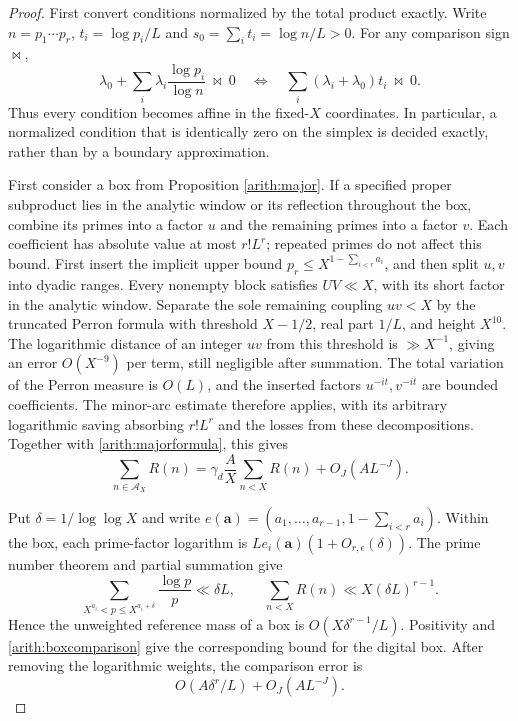 \documentclass[11pt,a4paper]{article}
\theoremstyle{paperplain}
\numberwithin{equation}{section}
\begin{document}
\begin{proof}
First convert conditions normalized by the total product exactly.
Write $n=p_1\cdots p_r$, $t_i=\log p_i/L$ and
$s_0=\sum_i t_i=\log n/L>0$. For any comparison sign $\bowtie$,
\begin{equation}\label{arith:homogenize}
 \lambda_0+\sum_i\lambda_i\frac{\log p_i}{\log n}\ \bowtie\ 0
 \quad\Longleftrightarrow\quad
 \sum_i(\lambda_i+\lambda_0)t_i\ \bowtie\ 0.
\end{equation}
Thus every condition becomes affine in the fixed-$X$ coordinates.
In particular, a normalized condition that is identically zero on
the simplex is decided exactly, rather than by a boundary approximation.

First consider a box from Proposition \ref{arith:major}.
If a specified proper subproduct lies in the analytic window or its
reflection throughout the box, combine its primes into a factor $u$
and the remaining primes into a factor $v$.
Each coefficient has absolute value at most $r!L^r$; repeated primes
do not affect this bound.
First insert the implicit upper bound $p_r\le X^{1-\sum_{i<r}a_i}$,
and then split $u,v$ into dyadic ranges.
Every nonempty block satisfies $UV\ll X$, with its short factor in
the analytic window.
Separate the sole remaining coupling $uv<X$ by the truncated Perron
formula with threshold $X-1/2$, real part $1/L$, and height $X^{10}$.
The logarithmic distance of an integer $uv$ from this threshold is
$\gg X^{-1}$, giving an error $O(X^{-9})$ per term, still negligible
after summation.
The total variation of the Perron measure is $O(L)$, and the inserted
factors $u^{-it},v^{-it}$ are bounded coefficients.
The minor-arc estimate therefore applies, with its arbitrary logarithmic
saving absorbing $r!L^r$ and the losses from these decompositions.
Together with \eqref{arith:majorformula}, this gives
\begin{equation}\label{arith:boxcomparison}
 \sum_{n\in\mathcal A_X}R(n)
 =\gamma_d\frac AX\sum_{n<X}R(n)+O_J(AL^{-J}).
\end{equation}

Put $\delta=1/\log\log X$ and write
$e(\boldsymbol a)=(a_1,\ldots,a_{r-1},1-\sum_{i<r}a_i)$.
Within the box, each prime-factor logarithm is
$L e_i(\boldsymbol a)(1+O_{r,\epsilon}(\delta))$.
The prime number theorem and partial summation give
\[
 \sum_{X^{a_i}<p\le X^{a_i+\delta}}\frac{\log p}{p}
       \ll\delta L,
 \qquad \sum_{n<X}R(n)\ll X(\delta L)^{r-1}.
\]
Hence the unweighted reference mass of a box is
$O(X\delta^{r-1}/L)$.
Positivity and \eqref{arith:boxcomparison} give the corresponding
bound for the digital box. After removing the logarithmic weights,
the comparison error is
\begin{equation}\label{arith:boxerror}
 O(A\delta^r/L)+O_J(AL^{-J}).
\end{equation}


\end{proof}
\end{document}
